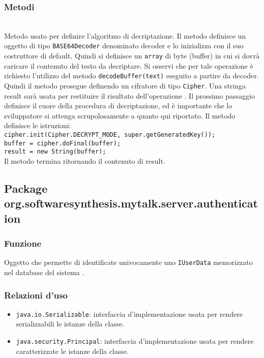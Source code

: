 \subsubsection*{Metodi}
\begin{description}

	\item{}\\
	Metodo usato per definire l'algoritmo di decriptazione. Il metodo definisce un oggetto di tipo \texttt{BASE64Decoder} denominato decoder e lo inizializza con il suo costruttore di default. Quindi si definisce un \texttt{array} di byte (buffer) in cui si dovrà caricare il contenuto del testo da decriptare. Si osservi che per tale operazione è richiesto l'utilizzo del metodo \texttt{decodeBuffer(text)} eseguito a partire da decoder. Quindi il metodo prosegue definendo  un cifratore di tipo \texttt{Cipher}. Una stringa result sarà usata per restituire il risultato dell'operazione . Il prossimo passaggio definisce il cuore della procedura di decriptazione, ed è importante che lo sviluppatore si attenga scrupolosamente a quanto qui riportato. Il metodo definisce le istruzioni:\\
	
	\verb|cipher.init(Cipher.DECRYPT_MODE, super.getGeneratedKey());|\\
	\verb|buffer = cipher.doFinal(buffer);|\\
	\verb|result = new String(buffer);|\\
	
	Il metodo termina ritornando il contenuto di result.
	
\end{description}

\subsection{Package org.softwaresynthesis.mytalk.server.authentication}\label{sec:authentication}


\subsubsection*{Funzione}
Oggetto che permette di identificate univocamente uno \texttt{IUserData} memorizzato nel database del sistema \caName.

\subsubsection*{Relazioni d'uso}
\begin{itemize}
	\item \texttt{java.io.Serializable}: interfaccia d'implementazione usata per rendere serializzabili le istanze della classe.
	\item \texttt{java.security.Principal}: interfaccia d'implementazione usata per rendere caratterizzate le istanze della classe.
\end{itemize}

